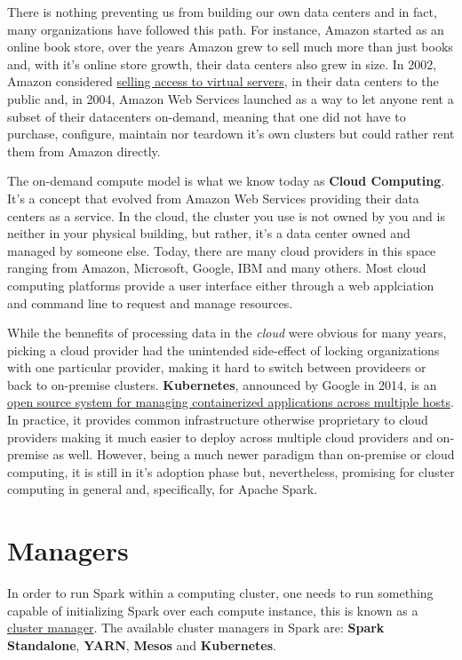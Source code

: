 \documentclass[]{book}
\theoremstyle{definition}
\theoremstyle{definition}
\theoremstyle{definition}
\theoremstyle{remark}
\begin{document}
There is nothing preventing us from building our own data centers and in
fact, many organizations have followed this path. For instance, Amazon
started as an online book store, over the years Amazon grew to sell much
more than just books and, with it's online store growth, their data
centers also grew in size. In 2002, Amazon considered
\href{https://en.wikipedia.org/wiki/Amazon_Web_Services\#History}{selling
access to virtual servers}, in their data centers to the public and, in
2004, Amazon Web Services launched as a way to let anyone rent a subset
of their datacenters on-demand, meaning that one did not have to
purchase, configure, maintain nor teardown it's own clusters but could
rather rent them from Amazon directly.

The on-demand compute model is what we know today as \textbf{Cloud
Computing}. It's a concept that evolved from Amazon Web Services
providing their data centers as a service. In the cloud, the cluster you
use is not owned by you and is neither in your physical building, but
rather, it's a data center owned and managed by someone else. Today,
there are many cloud providers in this space ranging from Amazon,
Microsoft, Google, IBM and many others. Most cloud computing platforms
provide a user interface either through a web applciation and command
line to request and manage resources.

While the bennefits of processing data in the \emph{cloud} were obvious
for many years, picking a cloud provider had the unintended side-effect
of locking organizations with one particular provider, making it hard to
switch between provideers or back to on-premise clusters.
\textbf{Kubernetes}, announced by Google in 2014, is an
\href{https://github.com/kubernetes/kubernetes/}{open source system for
managing containerized applications across multiple hosts}. In practice,
it provides common infrastructure otherwise proprietary to cloud
providers making it much easier to deploy across multiple cloud
providers and on-premise as well. However, being a much newer paradigm
than on-premise or cloud computing, it is still in it's adoption phase
but, nevertheless, promising for cluster computing in general and,
specifically, for Apache Spark.

\hypertarget{managers}{%
\section{Managers}\label{managers}}

In order to run Spark within a computing cluster, one needs to run
something capable of initializing Spark over each compute instance, this
is known as a
\href{https://en.wikipedia.org/wiki/Cluster_manager}{cluster manager}.
The available cluster managers in Spark are: \textbf{Spark Standalone},
\textbf{YARN}, \textbf{Mesos} and \textbf{Kubernetes}.
\end{document}

